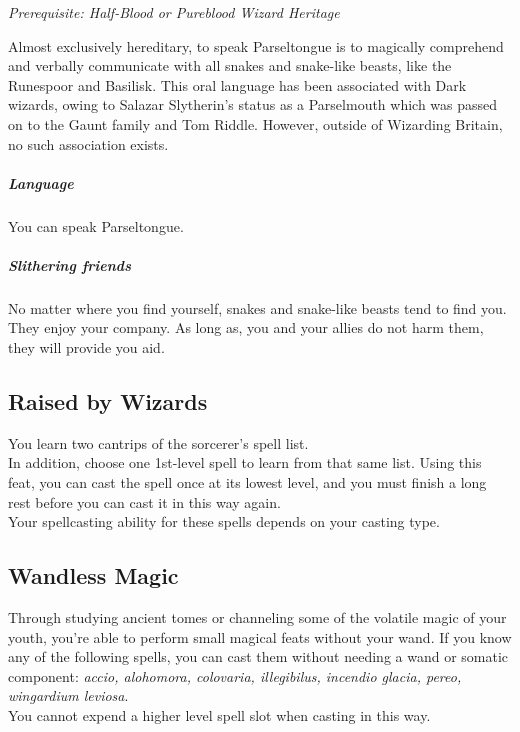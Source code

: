 \documentclass[a4paper,twocolumn,openany,nodeprecatedcode]{dndbook}
\begin{document}
        \textit{Prerequisite: Half-Blood or Pureblood Wizard Heritage}

        Almost exclusively hereditary, to speak Parseltongue is to magically comprehend and verbally communicate with all snakes and snake-like beasts, like the Runespoor and Basilisk. This oral language has been associated with Dark wizards, owing to Salazar Slytherin's status as a Parselmouth which was passed on to the Gaunt family and Tom Riddle. However, outside of Wizarding Britain, no such association exists.

        \subparagraph{Language} You can speak Parseltongue.

        \subparagraph{Slithering friends}
        No matter where you find yourself,
        snakes and snake-like beasts tend to find you.
        They enjoy your company.
        As long as, you and your allies do not harm them, they will provide you aid.


    \subsection{Raised by Wizards}

        You learn two cantrips of the sorcerer's spell list.\\
        In addition, choose one 1st-level spell to learn from that same list.
        Using this feat, you can cast the spell once at its lowest level, and you must finish a long rest before you can cast it in this way again.\\

        Your spellcasting ability for these spells depends on your casting type.


    \subsection{Wandless Magic}

        Through studying ancient tomes or channeling some of the volatile magic of your youth, you're able to perform small magical feats without your wand.
        If you know any of the following spells, you can cast them without needing a wand or somatic component: \textit{accio, alohomora, colovaria, illegibilus, incendio glacia, pereo, wingardium leviosa}.\\
        You cannot expend a higher level spell slot when casting in this way.
\end{document}
